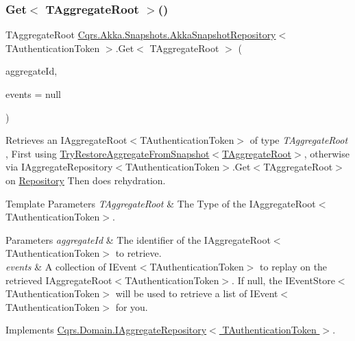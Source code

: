 \subsubsection{\texorpdfstring{Get$<$ T\+Aggregate\+Root $>$()}{Get< TAggregateRoot >()}}
{\footnotesize\ttfamily T\+Aggregate\+Root \hyperlink{classCqrs_1_1Akka_1_1Snapshots_1_1AkkaSnapshotRepository}{Cqrs.\+Akka.\+Snapshots.\+Akka\+Snapshot\+Repository}$<$ T\+Authentication\+Token $>$.Get$<$ T\+Aggregate\+Root $>$ (\begin{DoxyParamCaption}\item[{Guid}]{aggregate\+Id,  }\item[{I\+List$<$ \hyperlink{interfaceCqrs_1_1Events_1_1IEvent}{I\+Event}$<$ T\+Authentication\+Token $>$$>$}]{events = {\ttfamily null} }\end{DoxyParamCaption})}



Retrieves an I\+Aggregate\+Root$<$\+T\+Authentication\+Token$>$ of type {\itshape T\+Aggregate\+Root} , First using \hyperlink{classCqrs_1_1Akka_1_1Snapshots_1_1AkkaSnapshotRepository_aeec6fc99d17848302d908361ea407908_aeec6fc99d17848302d908361ea407908}{Try\+Restore\+Aggregate\+From\+Snapshot$<$\+T\+Aggregate\+Root$>$}, otherwise via I\+Aggregate\+Repository$<$\+T\+Authentication\+Token$>$.\+Get$<$\+T\+Aggregate\+Root$>$ on \hyperlink{classCqrs_1_1Akka_1_1Snapshots_1_1AkkaSnapshotRepository_a4961f1b8481f1205c143172185bae3bb_a4961f1b8481f1205c143172185bae3bb}{Repository} Then does rehydration. 


\begin{DoxyTemplParams}{Template Parameters}
{\em T\+Aggregate\+Root} & The Type of the I\+Aggregate\+Root$<$\+T\+Authentication\+Token$>$.\\
\hline
\end{DoxyTemplParams}

\begin{DoxyParams}{Parameters}
{\em aggregate\+Id} & The identifier of the I\+Aggregate\+Root$<$\+T\+Authentication\+Token$>$ to retrieve.\\
\hline
{\em events} & A collection of I\+Event$<$\+T\+Authentication\+Token$>$ to replay on the retrieved I\+Aggregate\+Root$<$\+T\+Authentication\+Token$>$. If null, the I\+Event\+Store$<$\+T\+Authentication\+Token$>$ will be used to retrieve a list of I\+Event$<$\+T\+Authentication\+Token$>$ for you. \\
\hline
\end{DoxyParams}


Implements \hyperlink{interfaceCqrs_1_1Domain_1_1IAggregateRepository_a890633fddbd05bd3b9e9968a2de095bb_a890633fddbd05bd3b9e9968a2de095bb}{Cqrs.\+Domain.\+I\+Aggregate\+Repository$<$ T\+Authentication\+Token $>$}.


